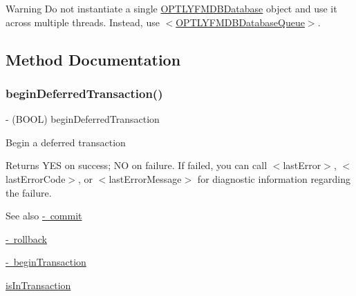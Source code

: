 \begin{DoxyWarning}{Warning}
Do not instantiate a single {\ttfamily \mbox{\hyperlink{interface_o_p_t_l_y_f_m_d_b_database}{O\+P\+T\+L\+Y\+F\+M\+D\+B\+Database}}} object and use it across multiple threads. Instead, use {\ttfamily $<$\mbox{\hyperlink{interface_o_p_t_l_y_f_m_d_b_database_queue}{O\+P\+T\+L\+Y\+F\+M\+D\+B\+Database\+Queue}}$>$}. 
\end{DoxyWarning}


\subsection{Method Documentation}
\mbox{\label{interface_o_p_t_l_y_f_m_d_b_database_ae42926b392d7862b8e4a2c7da6e12552}} 
\subsubsection{\texorpdfstring{begin\+Deferred\+Transaction()}{beginDeferredTransaction()}}
{\footnotesize\ttfamily -\/ (B\+O\+OL) begin\+Deferred\+Transaction \begin{DoxyParamCaption}{ }\end{DoxyParamCaption}}

Begin a deferred transaction

\begin{DoxyReturn}{Returns}
{\ttfamily Y\+ES} on success; {\ttfamily NO} on failure. If failed, you can call {\ttfamily $<$last\+Error$>$}, {\ttfamily $<$last\+Error\+Code$>$}, or {\ttfamily $<$last\+Error\+Message$>$} for diagnostic information regarding the failure.
\end{DoxyReturn}
\begin{DoxySeeAlso}{See also}
\mbox{\hyperlink{interface_o_p_t_l_y_f_m_d_b_database_a13149a1989b1cdb7a6f7b8f2b4207cfd}{-\/ commit}} 

\mbox{\hyperlink{interface_o_p_t_l_y_f_m_d_b_database_a511569a0ee0c82136255920ebe9d28e6}{-\/ rollback}} 

\mbox{\hyperlink{interface_o_p_t_l_y_f_m_d_b_database_aa49b282394be0570adb7ae4b8544b6b5}{-\/ begin\+Transaction}} 

\mbox{\hyperlink{interface_o_p_t_l_y_f_m_d_b_database_aad9ac9a8b17ad02d9595a11567ceb404}{is\+In\+Transaction}} 
\end{DoxySeeAlso}
\mbox{\label{interface_o_p_t_l_y_f_m_d_b_database_aa49b282394be0570adb7ae4b8544b6b5}} 
